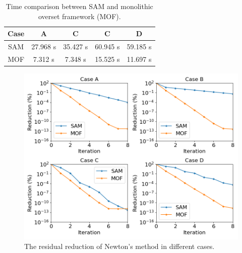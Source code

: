 \documentclass[preprint,12pt,sort&compress]{elsarticle}
\theoremstyle{definition}%
\begin{document}
\begin{table}
  \centering
  \begin{tabular}{ |c|c|c|c|c|}
    \hline
    Case & A & C & C & D \\
    \hline
    \hline
    SAM & 27.968 s & 35.427 s & 60.945 s & 59.185 s \\
    \hline
    MOF & 7.312 s & 7.348 s & 15.525 s & 11.697 s \\
    \hline
  \end{tabular}
  \caption{Time comparison between SAM and monolithic overset framework (MOF).}
  \label{tab:burgers-time}
\end{table}
\begin{figure}
  \centering
  \includegraphics[angle=0,width=1.\textwidth]{fig/burgers-reduction_1.png}
  \caption{The residual reduction of Newton's method in different cases.}
  \label{fig:burgers-reduction}
\end{figure}
\end{document}
